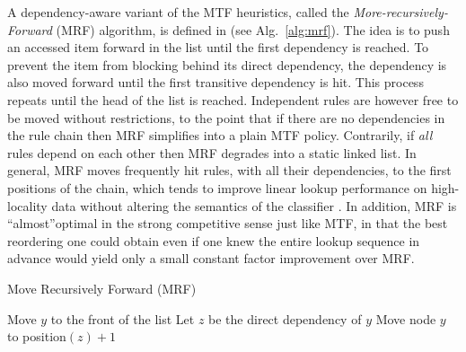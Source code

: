       
      

A dependency-aware variant of the MTF heuristics, called the \emph{More-recursively-Forward} (MRF) algorithm, is defined in \cite{10228937} (see Alg.~\ref{alg:mrf}). The idea is to push an accessed item forward in the list until the first dependency is reached. To prevent the item from blocking behind its direct dependency, the dependency is also moved forward until the first transitive dependency is hit. This process repeats until the head of the list is reached.  Independent rules are however free to be moved without restrictions, to the point that if there are no dependencies in the rule chain then MRF simplifies into a plain MTF policy.  Contrarily, if \emph{all} rules depend on each other then MRF degrades into a static linked list. In general, MRF moves frequently hit rules, with all their dependencies, to the first positions of the chain, which tends to improve linear lookup performance on high-locality data without altering the semantics of the classifier \cite{10228937}. In addition, MRF is ``almost''optimal in the strong competitive sense just like MTF, in that the best reordering one could obtain even if one knew the entire lookup sequence in advance would yield only a small constant factor improvement over MRF.

\begin{algorithm}[t]
  \caption{Move Recursively Forward (MRF)}
  \label{alg:mrf}
  \begin{small}
    \begin{algorithmic}[1]
      \State Move $y$ to the front of the list
      \Else
      \State Let $z$ be the direct dependency of $y$
      \State Move node $y$ to position$(z) + 1$
      \State {}
      \EndIf
      \EndProcedure
    \end{algorithmic}
  \end{small}
\end{algorithm}


